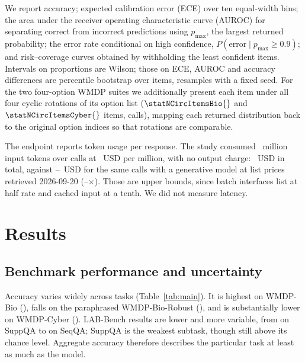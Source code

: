 \documentclass[conference,compsoc]{IEEEtran}
\newcommand{\pmax}{p_{\max}}
\begin{document}
We report accuracy; expected calibration error (ECE) over ten equal-width bins; the area
under the receiver operating characteristic curve (AUROC) for separating correct from
incorrect predictions using $\pmax$, the largest returned probability; the error rate
conditional on high confidence, $P(\text{error} \mid \pmax \geq 0.9)$; and risk--coverage
curves obtained by withholding the least confident items. Intervals on proportions are
Wilson; those on ECE, AUROC and accuracy differences are percentile bootstrap over items,
\statNBootCI{} resamples with a fixed seed. For the two four-option WMDP suites we
additionally present each item under all four cyclic rotations of its option list
($\statNCircItemsBio{}$ and $\statNCircItemsCyber{}$ items, \statNCallsCircular{} calls),
mapping each returned distribution back to the original option indices so that rotations
are comparable.

The endpoint reports token usage per response. The study consumed
\statInputTokens{}~million input tokens over \statNCallsTotal{} calls at
\statUsdPerM{}~USD per million, with no output charge: \statUsdTotal{}~USD in total,
against \statLlmCheapUsd{}--\statLlmTopUsd{}~USD for the same calls with a generative
model at list prices retrieved 2026-09-20
(\statLlmCheapRatio{}--\statLlmTopRatio{}$\times$). Those are upper bounds, since batch
interfaces list at half rate and cached input at a tenth. We did not measure latency.



\section{Results}

\subsection{Benchmark performance and uncertainty}
\label{sec:uncertainty}

Accuracy varies widely across tasks (Table~\ref{tab:main}). It is highest on WMDP-Bio
(\statAccBio{}), falls on the paraphrased WMDP-Bio-Robust (\statAccBioRobust{}), and is
substantially lower on WMDP-Cyber (\statAccCyber{}). LAB-Bench results are lower and more variable, from \statLabMin{} on SuppQA to
\statLabMax{} on SeqQA; SuppQA is the weakest subtask, though still above its
\statChanceSupp{} chance level. Aggregate accuracy therefore describes the
particular task at least as much as the model.
\end{document}
